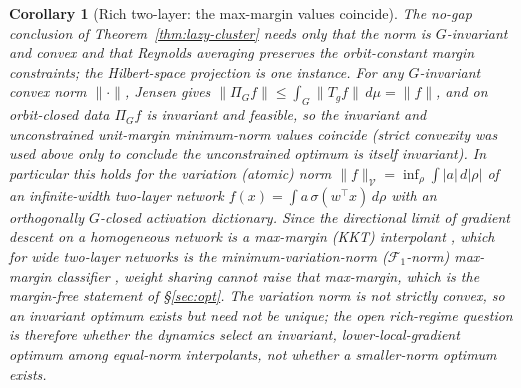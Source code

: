 \documentclass{article}
\newtheorem{corollary}{Corollary}
\theoremstyle{definition}
\begin{document}
\begin{corollary}[Rich two-layer: the max-margin values coincide]\label{cor:no-gap-var}
The no-gap conclusion of Theorem~\ref{thm:lazy-cluster} needs only that the norm is $G$-invariant and convex and that Reynolds averaging preserves the orbit-constant margin constraints; the Hilbert-space projection is one instance. For any $G$-invariant convex norm $\|\cdot\|$, Jensen gives $\|\Pi_G f\|\le\int_G\|T_g f\|\,d\mu=\|f\|$, and on orbit-closed data $\Pi_G f$ is invariant and feasible, so the invariant and unconstrained unit-margin minimum-norm values coincide (strict convexity was used above only to conclude the unconstrained optimum is \emph{itself} invariant). In particular this holds for the variation (atomic) norm $\|f\|_{\mathcal V}=\inf_\rho\int|a|\,d|\rho|$ of an infinite-width two-layer network $f(x)=\int a\,\sigma(w^\top x)\,d\rho$ with an orthogonally $G$-closed activation dictionary. Since the directional limit of gradient descent on a homogeneous network is a max-margin (KKT) interpolant \citep{lyu2020gradient,ji2020directional}, which for wide two-layer networks is the minimum-variation-norm ($\mathcal F_1$-norm) max-margin classifier \citep{chizat2020implicit}, weight sharing cannot raise that max-margin, which is the margin-free statement of \S\ref{sec:opt}. The variation norm is not strictly convex, so an invariant optimum exists but need not be unique; the open rich-regime question is therefore whether the dynamics select an invariant, lower-local-gradient optimum among equal-norm interpolants, not whether a smaller-norm optimum exists.
\end{corollary}
\end{document}
